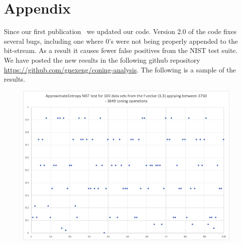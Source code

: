 \documentclass[oneside,12pt]{amsart}
\theoremstyle{definition}
\numberwithin{equation}{section}
\begin{document}



\clearpage
\section{Appendix} \label{appendix}


Since our first publication~\cite{ALDH} we updated our code. Version 2.0 of the code fixes several bugs, including one where 0's were not being properly appended to the bit-stream. As a result it causes fewer false positives from the NIST test suite. We have posted the new results in the following github repository \url{https://github.com/gnexeng/coning-analysis}. The following is a sample of the results. 

\begin{figure}[h!]
\centering
\includegraphics[scale=.5]{./charts/ApproximateEntropy_3_3.png}
\label{fig:approxentropy33}
\end{figure}
\end{document}

